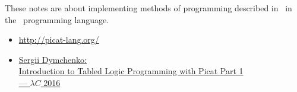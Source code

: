 
These notes are about implementing methods of programming described in \cite{taop}\ in the \cat\ programming language.



\begin{itemize}
\item \url{http://picat-lang.org/}
\item \href{https://www.youtube.com/watch?v=wXtes_nPVEw}{Sergii Dymchenko:\\
            Introduction to Tabled Logic Programming with Picat Part 1\\--- $\lambda C$ 2016}
\end{itemize}
